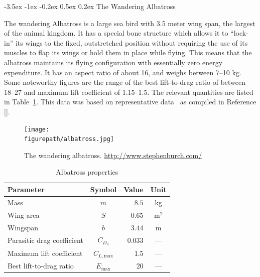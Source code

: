 \documentclass[11pt,letterpaper,onecolumn]{article}
\makeatletter
\newcommand{\figurepath}{../fig/term-project}
\renewcommand\subsection{\@startsection{subsection}{1}{\z@}%
{-3.5ex \@plus-1ex \@minus-0.2ex}%
{0.5ex \@plus0.2ex}%
{\fontsize{10pt}{10pt}\selectfont\bfseries\sffamily}}
\makeatother
\begin{document}
  \subsection{The Wandering Albatross}

  The wandering Albatross is a large sea bird with 3.5 meter wing span, the largest of the animal kingdom.
  It has a special bone structure which allows it to ``lock-in'' its wings to the fixed, outstretched position without requiring the use of its muscles to flap its wings or hold them in place while flying.
  This means that the albatross maintains its flying configuration with essentially zero energy expenditure.
  It has an aspect ratio of about 16, and weighs between 7--10 kg.
  Some noteworthy figures are the range of the best lift-to-drag ratio of between 18--27\cite{barnes.howflies.2004,alexander.naturesflyers.2004,denny.dynamicsoaring.2009} and maximum lift coefficient of 1.15--1.5\cite{pennycuick.glidingpetrel.1960,wood.flight.1973,pennycuick.flight.1982}.
  The relevant quantities are listed in Table~\ref{tab.albatrossdata}.
  This data was based on representative data~\cite{tucker.falconaero.1970,wood.flight.1973,pennycuick.flight.1982} as compiled in Reference [].

  \begin{figure}[h]
    \begin{center}
      \texttt{[image: \\figurepath/albatross.jpg]}
      \caption{The wandering albatross. \url{http://www.stephenburch.com/}\label{fig:part3_multiple_state}}
    \end{center}
  \end{figure}

  \begin{table}[H]
    \centering
    \caption{Albatross properties}
    \begin{tabular}{lcrc}
      \toprule
      Parameter                   & Symbol              & Value   & Unit \\ \midrule
      Mass                        & $m$                 & $8.5$   & kg \\
      Wing area                   & $S$                 & $0.65$  & m$^{2}$ \\
      Wingspan                    & $b$                 & $3.44$  & m \\
      Parasitic drag coefficient  & $C_{D_{0}}$         & 0.033   & --- \\
      Maximum lift coefficient    & $C_{L,\text{max}}$  & 1.5     & --- \\
      Best lift-to-drag ratio     & $E_{\text{max}}$    & 20      & --- \\
      \bottomrule
    \end{tabular}\label{tab.albatrossdata}
  \end{table}
\end{document}
